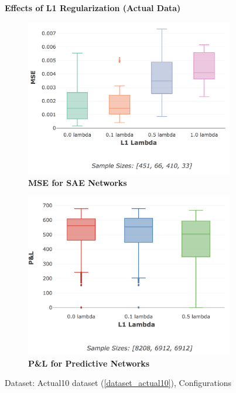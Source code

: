\documentclass[a4paper,11pt,oneside]{article}
\theoremstyle{plain}
\theoremstyle{definition}
\begin{document}
\begin{figure}[H]
	\centering
	\textbf{Effects of L1 Regularization (Actual Data)}
	\begin{subfigure}{.5\textwidth}
		\centering 
		\includegraphics[scale=0.24]{images/results/network/reg/actual_mse_reg.png}
		\caption{\textbf{MSE for SAE Networks} 
			\newline }
		\label{figure-actual_mse_reg}
	\end{subfigure}%
	\begin{subfigure}{.5\textwidth}
		\centering 
		\includegraphics[scale=0.24]{images/results/network/reg/actual_pl_reg.png}
		\caption{\textbf{P\&L for Predictive Networks} 
			\newline }
		\label{figure-actual_pl_reg}
	\end{subfigure}
	\caption{Dataset: Actual10 dataset (\ref{dataset_actual10}), Configurations
		\newline }
	\label{figure-results-reg}
\end{figure}
\end{document}
